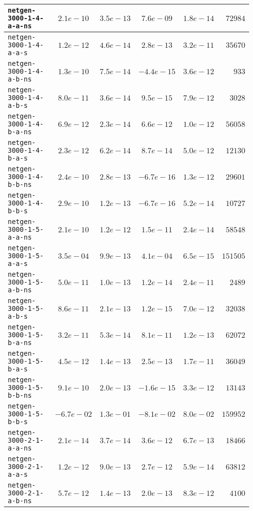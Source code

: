 \begin{center}
\begin{longtable}{|l || c | c | c | c | r|}
\hline
\texttt{netgen-3000-1-4-a-a-ns} & $2.1e-10$ & $3.5e-13$ & $7.6e-09$ & $1.8e-14$ & $72984$ \\
\hline
\texttt{netgen-3000-1-4-a-a-s} & $1.2e-12$ & $4.6e-14$ & $2.8e-13$ & $3.2e-11$ & $35670$ \\
\hline
\texttt{netgen-3000-1-4-a-b-ns} & $1.3e-10$ & $7.5e-14$ & $-4.4e-15$ & $3.6e-12$ & $933$ \\
\hline
\texttt{netgen-3000-1-4-a-b-s} & $8.0e-11$ & $3.6e-14$ & $9.5e-15$ & $7.9e-12$ & $3028$ \\
\hline
\texttt{netgen-3000-1-4-b-a-ns} & $6.9e-12$ & $2.3e-14$ & $6.6e-12$ & $1.0e-12$ & $56058$ \\
\hline
\texttt{netgen-3000-1-4-b-a-s} & $2.3e-12$ & $6.2e-14$ & $8.7e-14$ & $5.0e-12$ & $12130$ \\
\hline
\texttt{netgen-3000-1-4-b-b-ns} & $2.4e-10$ & $2.8e-13$ & $-6.7e-16$ & $1.3e-12$ & $29601$ \\
\hline
\texttt{netgen-3000-1-4-b-b-s} & $2.9e-10$ & $1.2e-13$ & $-6.7e-16$ & $5.2e-14$ & $10727$ \\
\hline
\texttt{netgen-3000-1-5-a-a-ns} & $2.1e-10$ & $1.2e-12$ & $1.5e-11$ & $2.4e-14$ & $58548$ \\
\hline
\texttt{netgen-3000-1-5-a-a-s} & $3.5e-04$ & $9.9e-13$ & $4.1e-04$ & $6.5e-15$ & $151505$ \\
\hline
\texttt{netgen-3000-1-5-a-b-ns} & $5.0e-11$ & $1.0e-13$ & $1.2e-14$ & $2.4e-11$ & $2489$ \\
\hline
\texttt{netgen-3000-1-5-a-b-s} & $8.6e-11$ & $2.1e-13$ & $1.2e-15$ & $7.0e-12$ & $32038$ \\
\hline
\texttt{netgen-3000-1-5-b-a-ns} & $3.2e-11$ & $5.3e-14$ & $8.1e-11$ & $1.2e-13$ & $62072$ \\
\hline
\texttt{netgen-3000-1-5-b-a-s} & $4.5e-12$ & $1.4e-13$ & $2.5e-13$ & $1.7e-11$ & $36049$ \\
\hline
\texttt{netgen-3000-1-5-b-b-ns} & $9.1e-10$ & $2.0e-13$ & $-1.6e-15$ & $3.3e-12$ & $13143$ \\
\hline
\texttt{netgen-3000-1-5-b-b-s} & $-6.7e-02$ & $1.3e-01$ & $-8.1e-02$ & $8.0e-02$ & $159952$ \\
\hline
\texttt{netgen-3000-2-1-a-a-ns} & $2.1e-14$ & $3.7e-14$ & $3.6e-12$ & $6.7e-13$ & $18466$ \\
\hline
\texttt{netgen-3000-2-1-a-a-s} & $1.2e-12$ & $9.0e-13$ & $2.7e-12$ & $5.9e-14$ & $63812$ \\
\hline
\texttt{netgen-3000-2-1-a-b-ns} & $5.7e-12$ & $1.4e-13$ & $2.0e-13$ & $8.3e-12$ & $4100$ \\

\end{longtable}
\end{center}
